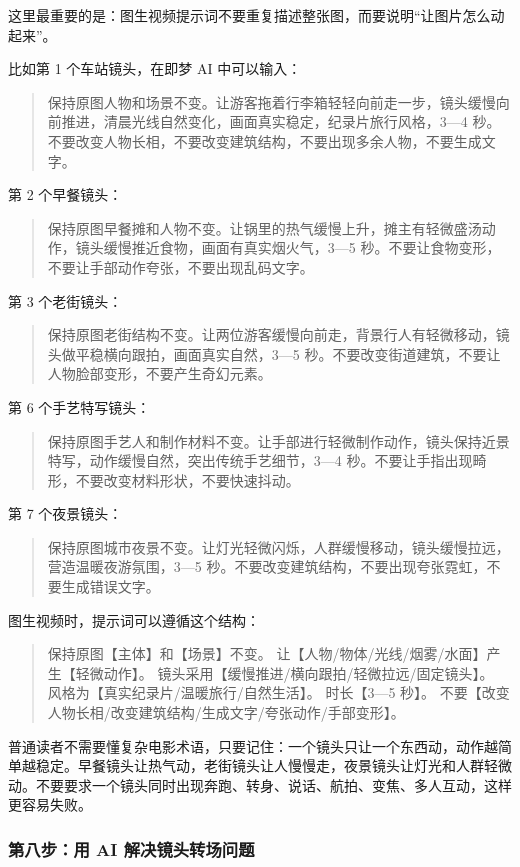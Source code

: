 这里最重要的是：图生视频提示词不要重复描述整张图，而要说明“让图片怎么动起来”。

比如第 1 个车站镜头，在即梦 AI 中可以输入：
\begin{quote}
保持原图人物和场景不变。让游客拖着行李箱轻轻向前走一步，镜头缓慢向前推进，清晨光线自然变化，画面真实稳定，纪录片旅行风格，3—4 秒。不要改变人物长相，不要改变建筑结构，不要出现多余人物，不要生成文字。
\end{quote}

第 2 个早餐镜头：
\begin{quote}
保持原图早餐摊和人物不变。让锅里的热气缓慢上升，摊主有轻微盛汤动作，镜头缓慢推近食物，画面有真实烟火气，3—5 秒。不要让食物变形，不要让手部动作夸张，不要出现乱码文字。
\end{quote}

第 3 个老街镜头：
\begin{quote}
保持原图老街结构不变。让两位游客缓慢向前走，背景行人有轻微移动，镜头做平稳横向跟拍，画面真实自然，3—5 秒。不要改变街道建筑，不要让人物脸部变形，不要产生奇幻元素。
\end{quote}

第 6 个手艺特写镜头：
\begin{quote}
保持原图手艺人和制作材料不变。让手部进行轻微制作动作，镜头保持近景特写，动作缓慢自然，突出传统手艺细节，3—4 秒。不要让手指出现畸形，不要改变材料形状，不要快速抖动。
\end{quote}

第 7 个夜景镜头：
\begin{quote}
保持原图城市夜景不变。让灯光轻微闪烁，人群缓慢移动，镜头缓慢拉远，营造温暖夜游氛围，3—5 秒。不要改变建筑结构，不要出现夸张霓虹，不要生成错误文字。
\end{quote}

图生视频时，提示词可以遵循这个结构：
\begin{quote}
保持原图【主体】和【场景】不变。
让【人物/物体/光线/烟雾/水面】产生【轻微动作】。
镜头采用【缓慢推进/横向跟拍/轻微拉远/固定镜头】。
风格为【真实纪录片/温暖旅行/自然生活】。
时长【3—5 秒】。
不要【改变人物长相/改变建筑结构/生成文字/夸张动作/手部变形】。
\end{quote}

普通读者不需要懂复杂电影术语，只要记住：一个镜头只让一个东西动，动作越简单越稳定。早餐镜头让热气动，老街镜头让人慢慢走，夜景镜头让灯光和人群轻微动。不要要求一个镜头同时出现奔跑、转身、说话、航拍、变焦、多人互动，这样更容易失败。

\subsubsection*{第八步：用 AI 解决镜头转场问题}

